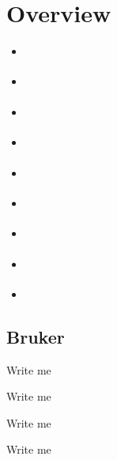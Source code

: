 \documentclass[letterpaper,10pt,english]{sphinxmanual}
\begin{document}
\chapter{Overview}
\label{\detokenize{Sub-Packages:overview}}\label{\detokenize{Sub-Packages::doc}}\begin{itemize}
\item {} 
\sphinxAtStartPar
{\hyperref[\detokenize{Sub-Packages:bruker-module}]{}}

\item {} 
\sphinxAtStartPar
{\hyperref[\detokenize{Sub-Packages:coloring-module}]{}}

\item {} 
\sphinxAtStartPar
{\hyperref[\detokenize{Sub-Packages:event-processing-module}]{}}

\item {} 
\sphinxAtStartPar
{\hyperref[\detokenize{Sub-Packages:io-module}]{}}

\item {} 
\sphinxAtStartPar
{\hyperref[\detokenize{Sub-Packages:image-processing-module}]{}}

\item {} 
\sphinxAtStartPar
{\hyperref[\detokenize{Sub-Packages:interactive-visuals-module}]{}}

\item {} 
\sphinxAtStartPar
{\hyperref[\detokenize{Sub-Packages:reorganization-module}]{}}

\item {} 
\sphinxAtStartPar
{\hyperref[\detokenize{Sub-Packages:trace-processing-module}]{}}

\item {} 
\sphinxAtStartPar
{\hyperref[\detokenize{Sub-Packages:static-visuals-module}]{}}

\end{itemize}


\section{Bruker}
\label{\detokenize{Sub-Packages:bruker}}\label{\detokenize{Sub-Packages:bruker-module}}
\begin{DUlineblock}{0em}
\item[] Write me
\item[] Write me
\item[] Write me
\item[] Write me
\end{DUlineblock}
\end{document}
